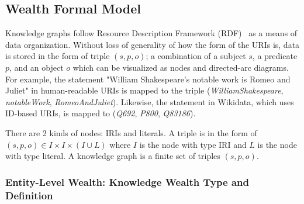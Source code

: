\subsection{Wealth Formal Model} \label{wealth-formal-model}
Knowledge graphs follow Resource Description Framework (RDF)~\cite{w3crdf} as a means of data organization. Without loss of generality of how the form of the URIs is, data is stored in the form of triple \((s, p, o)\); a combination of a subject \(s\), a predicate \(p\), and an object \(o\) which can be visualized as nodes and directed-arc diagrams. For example, the statement "William Shakespeare's notable work is Romeo and Juliet" in human-readable URIs is mapped to the triple (\textit{WilliamShakespeare}, \textit{notableWork}, \textit{RomeoAndJuliet}). Likewise, the statement in Wikidata, which uses ID-based URIs, is mapped to (\textit{Q692}, \textit{P800}, \textit{Q83186}).

There are 2 kinds of nodes: IRIs and literals. A triple is in the form of \((s, p, o) \in I \times I \times (I \cup L) \) where \(I\) is the node with type IRI and \(L\) is the node with type literal. A knowledge graph is a finite set of triples \((s, p, o)\).


\subsubsection{Entity-Level Wealth: Knowledge Wealth Type and Definition}

